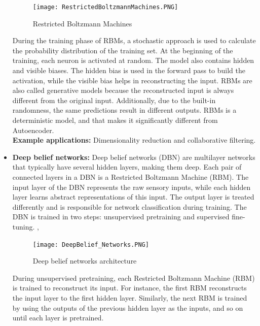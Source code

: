\begin{itemize}
    \begin{figure}[H]
        \centering
        \texttt{[image: RestrictedBoltzmannMachines.PNG]}
        \caption{Restricted Boltzmann Machines \cite{madhavan2017deep}}
        \label{fig:Restricted Boltzmann Machines}
    \end{figure}
    During the training phase of RBMs, a stochastic approach is used to calculate the probability distribution of the training set. At the beginning of the training, each neuron is activated at random. The model also contains hidden and visible biases. The hidden bias is used in the forward pass to build the activation, while the visible bias helps in reconstructing the input. RBMs are also called generative models because the reconstructed input is always different from the original input. Additionally, due to the built-in randomness, the same predictions result in different outputs. RBMs is a deterministic model, and that makes it significantly different from Autoencoder. \cite{madhavan2017deep} \cite{alzubaidi2021review} \\
    \textbf{Example applications:} Dimensionality reduction and collaborative filtering.\\
    \item \textbf{Deep belief networks: } Deep belief networks (DBN) are multilayer networks that typically have several hidden layers, making them deep. Each pair of connected layers in a DBN is a Restricted Boltzmann Machine (RBM). The input layer of the DBN represents the raw sensory inputs, while each hidden layer learns abstract representations of this input. The output layer is treated differently and is responsible for network classification during training. The DBN is trained in two steps: unsupervised pretraining and supervised fine-tuning. \cite{sohn2021deep}, \cite{coates2011analysis}
    
    \begin{figure}[H]
        \centering
        \texttt{[image: DeepBelief\_Networks.PNG]}
        \caption{Deep belief networks architecture \cite{madhavan2017deep}}
        \label{fig:Deep belief networks}
    \end{figure}
    During unsupervised pretraining, each Restricted Boltzmann Machine (RBM) is trained to reconstruct its input. For instance, the first RBM reconstructs the input layer to the first hidden layer. Similarly, the next RBM is trained by using the outputs of the previous hidden layer as the inputs, and so on until each layer is pretrained. 


\end{itemize}
